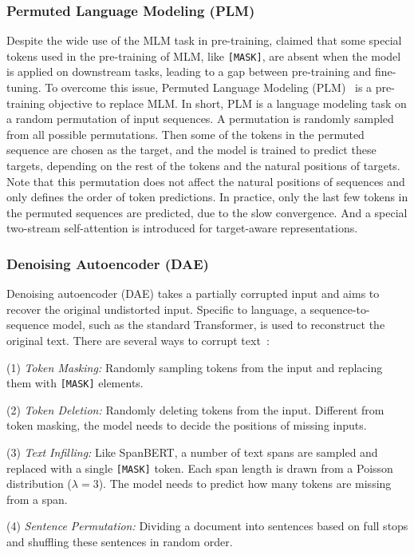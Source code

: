 \documentclass[fleqn]{SCYE-arxiv}
\begin{document}
\begin{multicols}{2}
\subsubsection{Permuted Language Modeling (PLM)}
Despite the wide use of the MLM task in pre-training, \citet{yang2019xlnet} claimed that some special tokens used in the pre-training of MLM, like \texttt{[MASK]}, are absent when the model is applied on downstream tasks, leading to a gap between pre-training and fine-tuning. To overcome this issue, Permuted Language Modeling (PLM)~\cite{yang2019xlnet} is a pre-training objective to replace MLM. In short, PLM is a language modeling task on a random permutation of input sequences. A permutation is randomly sampled from all possible permutations. Then some of the tokens in the permuted sequence are chosen as the target, and the model is trained to predict these targets, depending on the rest of the tokens and the natural positions of targets. Note that this permutation does not affect the natural positions of sequences and only defines the order of token predictions. In practice, only the last few tokens in the permuted sequences are predicted, due to the slow convergence. And a special two-stream self-attention is introduced for target-aware representations.

\subsubsection{Denoising Autoencoder (DAE)}

Denoising autoencoder (DAE) takes a partially corrupted input and aims to recover the original undistorted input. Specific to language, a sequence-to-sequence model, such as the standard Transformer, is used to reconstruct the original text. There are several ways to corrupt text~\cite{lewis2019bart}:

(1) \textit{Token Masking:} Randomly sampling tokens from the input and replacing them with \texttt{[MASK]} elements.

(2) \textit{Token Deletion:} Randomly deleting tokens from the input. Different from token masking, the model needs to decide the positions of missing inputs.

(3) \textit{Text Infilling:} Like SpanBERT, a number of text spans are sampled and replaced with a single \texttt{[MASK]} token. Each span length is drawn from a Poisson distribution ($\lambda = 3$). The model needs to predict how many tokens are missing from a span.

(4) \textit{Sentence Permutation:} Dividing a document into sentences based on full stops and shuffling these sentences in random order.


\end{multicols}
\end{document}
